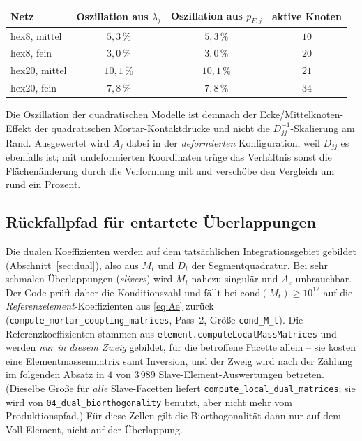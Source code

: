 \documentclass[a4paper,11pt]{article}
\def\bm#1{#1}%
\def\tilde#1{#1}%
\newcommand{\code}[1]{\texttt{\small #1}}
\newcommand{\file}[1]{\texttt{\small #1}}
\begin{document}
\begin{center}
\small
\begin{tabular}{lccc}
\toprule
Netz & Oszillation aus $\lambda_j$ & Oszillation aus $p_{F,j}$ & aktive Knoten \\
\midrule
hex8, mittel     & $5{,}3\,\%$  & $5{,}3\,\%$  & $10$ \\
hex8, fein       & $3{,}0\,\%$  & $3{,}0\,\%$  & $20$ \\
hex20, mittel    & $10{,}1\,\%$ & $10{,}1\,\%$ & $21$ \\
hex20, fein      & $7{,}8\,\%$  & $7{,}8\,\%$  & $34$ \\
\bottomrule
\end{tabular}
\end{center}

\noindent Die Oszillation der quadratischen Modelle ist demnach der Ecke/Mittel\-knoten-Effekt der
quadratischen Mortar-Kontaktdrücke und nicht die $\tilde D_{jj}^{-1}$-Skalierung am Rand. Ausgewertet
wird $A_j$ dabei in der \emph{deformierten} Konfiguration, weil $\tilde D_{jj}$ es ebenfalls ist;
mit undeformierten Koordinaten trüge das Verhältnis sonst die Flächenänderung durch die
Verformung mit und verschöbe den Vergleich um rund ein Prozent.

\subsection{Rückfallpfad für entartete Überlappungen}
\label{sec:sliver}
Die dualen Koeffizienten werden auf dem tatsächlichen Integrationsgebiet gebildet
(Abschnitt~\ref{sec:dual}), also aus $\bm M_t$ und $\bm D_t$ der Segmentquadratur. Bei sehr
schmalen Überlappungen (\emph{slivers}) wird $\bm M_t$ nahezu singulär und $\bm A_e$ unbrauchbar.
Der Code prüft daher die Konditionszahl und fällt bei $\mathrm{cond}(\bm M_t)\ge10^{12}$ auf die
\emph{Referenzelement}-Koeffizienten aus \eqref{eq:Ae} zurück
(\code{compute\_mortar\_coupling\_matrices}, Pass~2, Größe \code{cond\_M\_t}). Die
Referenzkoeffizienten stammen aus \code{element.computeLocalMassMatrices} und werden
\emph{nur in diesem Zweig} gebildet, für die betroffene Facette allein -- sie kosten eine
Elementmassenmatrix samt Inversion, und der Zweig wird nach der Zählung im folgenden Absatz in
$4$ von $3\,989$ Slave-Element-Auswertungen betreten. (Dieselbe Größe für \emph{alle}
Slave-Facetten liefert \code{compute\_local\_dual\_matrices}; sie wird von
\file{04\_dual\_biorthogonality} benutzt, aber nicht mehr vom Produktionspfad.) Für diese Zellen
gilt die Biorthogonalität dann nur auf dem Voll-Element, nicht auf der Überlappung.
\end{document}
